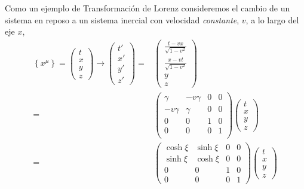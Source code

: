 \begin{frame}


Como un ejemplo de Transformación de Lorenz consideremos el cambio de un sistema en reposo a un sistema inercial con velocidad \emph{constante},  $v$, a lo largo del eje $x$,
\begin{align}
\label{eq:147}
  \left\{x^\mu\right\}=\begin{pmatrix}
    t\\
    x\\
    y\\
    z
  \end{pmatrix}\to
  \begin{pmatrix}
    t'\\
    x'\\
    y'\\
    z'
  \end{pmatrix}=&
  \begin{pmatrix}
  \displaystyle{ \frac{t-vx}{\sqrt{1-v^2}} }\\
  \displaystyle{ \frac{x-vt}{\sqrt{1-v^2}} }\\
    y\\
    z
  \end{pmatrix} \nonumber\\
=&\begin{pmatrix}
  \gamma   & -v \gamma & 0 & 0 \\
  -v \gamma & \gamma & 0 & 0\\
  0 & 0 & 1 & 0 \\
    0 & 0 & 0 & 1 \\
   \end{pmatrix} 
\begin{pmatrix}
    t\\
    x\\
    y\\
    z
  \end{pmatrix}\nonumber\\
  =&
  \begin{pmatrix}
    \cosh\xi&\sinh\xi&0&0\\
    \sinh\xi&\cosh\xi&0&0\\
    0     &  0  &1&0\\
    0     &  0  &0&1
  \end{pmatrix}
  \begin{pmatrix}
    t\\
    x\\
    y\\
    z
  \end{pmatrix} \nonumber\\

\end{align}
\end{frame}
